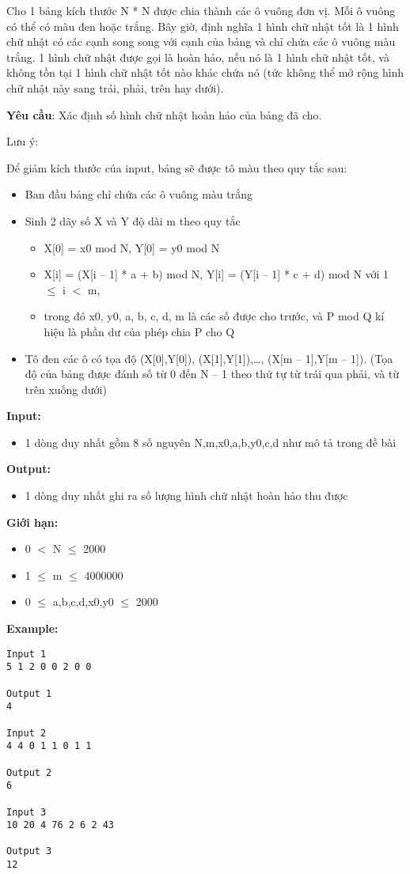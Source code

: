 

Cho 1 bảng kích thước N * N được chia thành các ô vuông đơn vị. Mỗi ô vuông có thể có màu đen hoặc trắng. Bây giờ, định nghĩa 1 hình chữ nhật tốt là 1 hình chữ nhật có các cạnh song song với cạnh của bảng và chỉ chứa các ô vuông màu trắng. 1 hình chữ nhật được gọi là hoàn hảo, nếu nó là 1 hình chữ nhật tốt, và không tồn tại 1 hình chữ nhật tốt nào khác chứa nó (tức không thể mở rộng hình chữ nhật này sang trái, phải, trên hay dưới).

\textbf{Yêu cầu}: Xác định số hình chữ nhật hoàn hảo của bảng đã cho.

Lưu ý:

Để giảm kích thước của input, bảng sẽ được tô màu theo quy tắc sau:
\begin{itemize}
	\item Ban đầu bảng chỉ chứa các ô vuông màu trắng
	\item Sinh 2 dãy số X và Y độ dài m theo quy tắc
\begin{itemize}
	\item X[0] = x0 mod N, Y[0] = y0 mod N
	\item X[i] = (X[i – 1] * a + b) mod N, Y[i] = (Y[i – 1] * c + d) mod N với 1  $\le$  i $<$ m,
	\item trong đó x0, y0, a, b, c, d, m là các số được cho trước, và P mod Q kí hiệu là phần dư của phép chia P cho Q
\end{itemize}
	\item Tô đen các ô có tọa độ (X[0],Y[0]), (X[1],Y[1]),…, (X[m – 1],Y[m – 1]). (Tọa độ của bảng được đánh số từ 0 đến N – 1 theo thứ tự từ trái qua phải, và từ trên xuống dưới)
\end{itemize}

\textbf{Input:}
\begin{itemize}
	\item 1 dòng duy nhất gồm 8 số nguyên N,m,x0,a,b,y0,c,d như mô tả trong đề bài
\end{itemize}

\textbf{Output:}
\begin{itemize}
	\item 1 dòng duy nhất ghi ra số lượng hình chữ nhật hoàn hảo thu được
\end{itemize}

\textbf{Giới hạn:}
\begin{itemize}
	\item 0 $<$ N  $\le$  2000
	\item 1  $\le$  m  $\le$  4000000
	\item 0  $\le$  a,b,c,d,x0,y0  $\le$  2000
\end{itemize}

\textbf{Example:}
\begin{verbatim}
Input 1
5 1 2 0 0 2 0 0

Output 1
4

Input 2
4 4 0 1 1 0 1 1

Output 2
6

Input 3
10 20 4 76 2 6 2 43

Output 3
12\end{verbatim}
